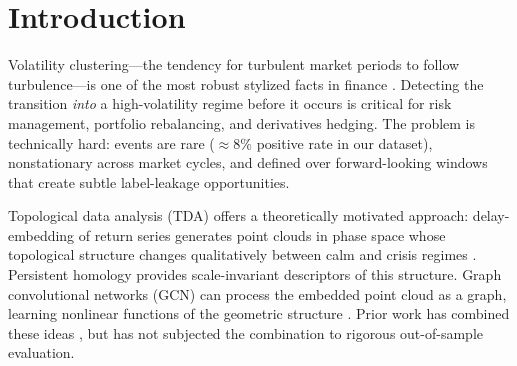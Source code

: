 \documentclass[sigconf]{acmart}
\begin{document}

\maketitle

\section{Introduction}

Volatility clustering---the tendency for turbulent market periods to follow
turbulence---is one of the most robust stylized facts in finance
\cite{cont2001}. Detecting the transition \emph{into} a high-volatility regime
before it occurs is critical for risk management, portfolio rebalancing, and
derivatives hedging. The problem is technically hard: events are rare
($\approx8\%$ positive rate in our dataset), nonstationary across market
cycles, and defined over forward-looking windows that create subtle
label-leakage opportunities.

Topological data analysis (TDA) offers a theoretically motivated approach:
delay-embedding of return series generates point clouds in phase space whose
topological structure changes qualitatively between calm and crisis regimes
\cite{gidea2018,umeda2017}. Persistent homology provides scale-invariant
descriptors of this structure. Graph convolutional networks (GCN) can process
the embedded point cloud as a graph, learning nonlinear functions of the
geometric structure \cite{kipf2017}. Prior work has combined these ideas
\cite{chen2022temporal}, but has not subjected the combination
to rigorous out-of-sample evaluation.
\end{document}
